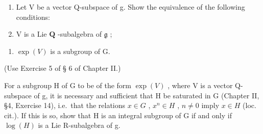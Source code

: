 \begin{enumerate}
\def\labelenumi{(\alph{enumi})}
\item
  Let V be a vector Q-subspace of g. Show the equivalence of the following conditions:
\item
  V is a Lie \(\mathbf{Q}\) -subalgebra of \(\mathfrak{g}\) ;
\end{enumerate}

\begin{enumerate}
\def\labelenumi{(\roman{enumi})}
\setcounter{enumi}{1}
\tightlist
\item
  \(\exp(V)\) is a subgroup of G.
\end{enumerate}

(Use Exercise 5 of § 6 of Chapter II.)

For a subgroup H of G to be of the form \(\exp(V)\) , where V is a vector Q-subspace of g, it is necessary and sufficient that H be saturated in G (Chapter II, §4, Exercise 14), i.e.~that the relations \(x \in G\) , \(x^{n} \in H\) , \(n \neq 0\) imply \(x \in H\) (loc. cit.). If this is so, show that H is an integral subgroup of G if and only if \(\log(H)\) is a Lie R-subalgebra of g.

